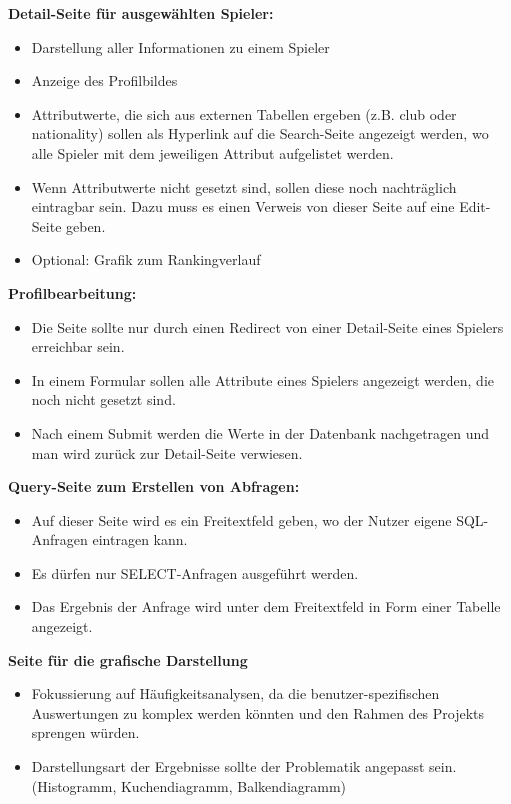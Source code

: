 \noindent\textbf{Detail-Seite für ausgewählten Spieler:}
\begin{itemize}
\item Darstellung aller Informationen zu einem Spieler
\item Anzeige des Profilbildes
\item Attributwerte, die sich aus externen Tabellen ergeben (z.B. club oder nationality) sollen als Hyperlink auf die Search-Seite angezeigt werden, wo alle Spieler mit dem jeweiligen Attribut aufgelistet werden.
\item Wenn Attributwerte nicht gesetzt sind, sollen diese noch nachträglich eintragbar sein. Dazu muss es einen Verweis von dieser Seite auf eine Edit-Seite geben.
\item Optional: Grafik zum Rankingverlauf
\end{itemize}

\noindent\textbf{Profilbearbeitung:}
\begin{itemize}
\item Die Seite sollte nur durch einen Redirect von einer Detail-Seite eines Spielers erreichbar sein.
\item In einem Formular sollen alle Attribute eines Spielers angezeigt werden, die noch nicht gesetzt sind.
\item Nach einem Submit werden die Werte in der Datenbank nachgetragen und man wird zurück zur Detail-Seite verwiesen.
\end{itemize}

\noindent\textbf{Query-Seite zum Erstellen von Abfragen:}
\begin{itemize}
\item Auf dieser Seite wird es ein Freitextfeld geben, wo der Nutzer eigene SQL-Anfragen eintragen kann.
\item Es dürfen nur SELECT-Anfragen ausgeführt werden.
\item Das Ergebnis der Anfrage wird unter dem Freitextfeld in Form einer Tabelle angezeigt.
\end{itemize}

\noindent\textbf{Seite für die grafische Darstellung}
\begin{itemize}
\item Fokussierung auf Häufigkeitsanalysen, da die benutzer-spezifischen Auswertungen zu komplex werden könnten und den Rahmen des Projekts sprengen würden.
\item Darstellungsart der Ergebnisse sollte der Problematik angepasst sein. (Histogramm, Kuchendiagramm, Balkendiagramm) 
\end{itemize}
